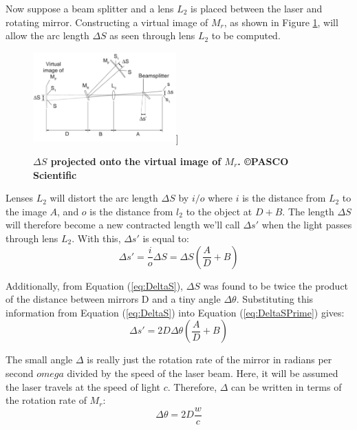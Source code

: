 \documentclass[twocolumn]{article}
\begin{document}
	Now suppose a beam splitter and a lens $L_2$ is placed between the laser and rotating mirror. 
	Constructing a virtual image of $M_r$, as shown in Figure \ref{fig:VirtualImage}, will allow the arc length $\Delta S$ as seen through lens $L_2$ to be computed. 
	\begin{figure}[!ht]
		\centering
		\includegraphics[width=0.49\textwidth]{Images/VirtualImageDiagram}]
		\caption{\textbf{$\Delta S$ projected onto the virtual image of $M_r$.\cite{lee_instruction_????} \copyright PASCO Scientific}}
		\label{fig:VirtualImage}
	\end{figure}
	
	Lenses $L_2$ will distort the arc length $\Delta S$ by $i/o$ where $i$ is the distance from $L_2$ to the image $A$, and $o$ is the distance from $l_2$ to the object at $D + B$. 
	The length $\Delta S$ will therefore become a new contracted length we'll call  $\Delta s'$ when the light passes through lens $L_2$. 
	With this, $\Delta s'$ is equal to:
	\begin{equation}
		\Delta s' = \frac{i}{o} \Delta S = \Delta S(\frac{A}{D}+B)
		\label{eq:DeltaSPrime}
	\end{equation}
	
	Additionally, from Equation (\ref{eq:DeltaS}), $\Delta S$ was found to be twice the product of the distance between mirrors D and a tiny angle $\Delta \theta$. Substituting this information from Equation (\ref{eq:DeltaS}) into Equation (\ref{eq:DeltaSPrime}) gives:
	\begin{equation}
		\Delta s' = 2D\Delta\theta(\frac{A}{D}+B)
		\label{eq:DeltaSPrime2}
	\end{equation}
	
	The small angle $\Delta$ is really just the rotation rate of the mirror in radians per second $omega$ divided by the speed of the laser beam. 
	Here, it will be assumed the laser travels at the speed of light $c$. 
	Therefore, $\Delta$ can be written in terms of the rotation rate of $M_r$:
	\begin{equation}
		\Delta\theta = 2D\frac{w}{c}
		\label{eq:DeltaTheta}
	\end{equation}
	
\end{document}
